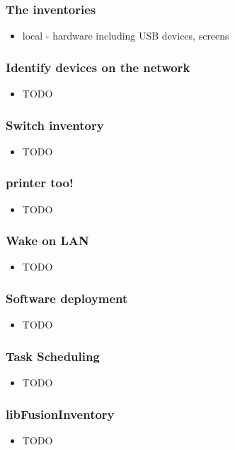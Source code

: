\begin{frame}
    \frametitle{The inventories}

    \begin{itemize}
        \item local - hardware including USB devices, screens
    \end{itemize}
\end{frame}

\begin{frame}
    \frametitle{Identify devices on the network}

    \begin{itemize}
        \item TODO
    \end{itemize}
\end{frame}

\begin{frame}
    \frametitle{Switch inventory}

    \begin{itemize}
        \item TODO
    \end{itemize}
\end{frame}

\begin{frame}
    \frametitle{printer too!}

    \begin{itemize}
        \item TODO
    \end{itemize}
\end{frame}

\begin{frame}
    \frametitle{Wake on LAN}

    \begin{itemize}
        \item TODO
    \end{itemize}
\end{frame}

\begin{frame}
    \frametitle{Software deployment}

    \begin{itemize}
        \item TODO
    \end{itemize}
\end{frame}

\begin{frame}
    \frametitle{Task Scheduling}

    \begin{itemize}
        \item TODO
    \end{itemize}
\end{frame}

\begin{frame}
    \frametitle{libFusionInventory}
    
    \begin{itemize}
        \item TODO
    \end{itemize}
\end{frame}
